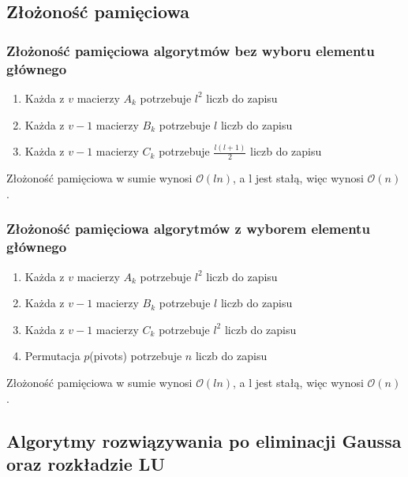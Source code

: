 \documentclass{article}
\begin{document}
\subsection{Złożoność pamięciowa}
\vspace{10pt}
\subsubsection{Złożoność pamięciowa algorytmów bez wyboru elementu głównego}
\begin{enumerate}
    \item Każda z $v$ macierzy $A_{k}$ potrzebuje $l^2$ liczb do zapisu
    \item Każda z $v - 1$ macierzy $B_{k}$ potrzebuje $l$ liczb do zapisu 
    \item Każda z $v-1$ macierzy $C_{k}$ potrzebuje $\frac{l(l+1)}{2}$ liczb do zapisu
\end{enumerate}
Złożoność pamięciowa w sumie wynosi $\mathcal{O}(ln)$, a l jest stałą, więc wynosi $\mathcal{O}(n)$.
\subsubsection{Złożoność pamięciowa algorytmów z wyborem elementu głównego}
\begin{enumerate}
    \item Każda z $v$ macierzy $A_{k}$ potrzebuje $l^2$ liczb do zapisu
    \item Każda z $v - 1$ macierzy $B_{k}$ potrzebuje $l$ liczb do zapisu 
    \item Każda z $v-1$ macierzy $C_{k}$ potrzebuje $l^2$ liczb do zapisu
    \item Permutacja $p$(pivots) potrzebuje $n$ liczb do zapisu
\end{enumerate}
Złożoność pamięciowa w sumie wynosi $\mathcal{O}(ln)$, a l jest stałą, więc wynosi $\mathcal{O}(n)$.
\subsection{Algorytmy rozwiązywania po eliminacji Gaussa oraz rozkładzie LU}
\vspace{10pt}
\end{document}
